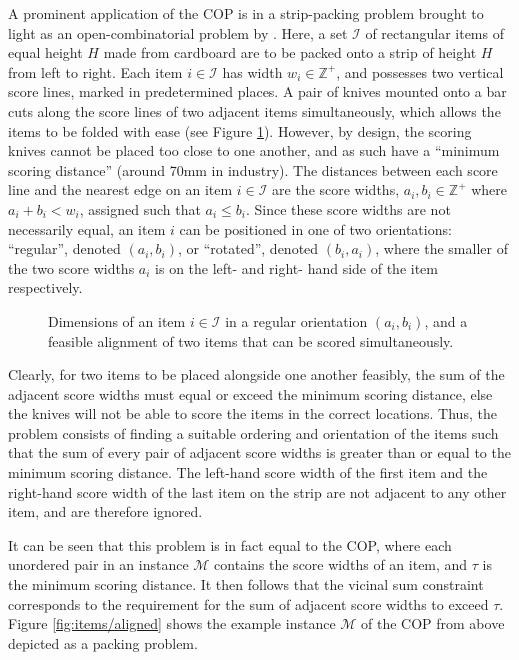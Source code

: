 \documentclass[oribibl]{llncs}
\begin{document}
A prominent application of the COP is in a strip-packing problem brought to light as an open-combinatorial problem by \cite{goulimis2004}. Here, a set $\mathcal{I}$ of rectangular items of equal height $H$ made from cardboard are to be packed onto a strip of height $H$ from left to right. Each item $i \in \mathcal{I}$ has width $w_i \in \mathbb{Z}^{+}$, and possesses two vertical score lines, marked in predetermined places. A pair of knives mounted onto a bar cuts along the score lines of two adjacent items simultaneously, which allows the items to be folded with ease (see Figure \ref{fig:itemsknife}). However, by design, the scoring knives cannot be placed too close to one another, and as such have a ``minimum scoring distance'' (around 70mm in industry). The distances between each score line and the nearest edge on an item $i \in \mathcal{I}$ are the score widths, $a_i, b_i \in \mathbb{Z}^{+}$ where $a_i + b_i < w_i$, assigned such that $a_i \leq b_i$. Since these score widths are not necessarily equal, an item $i$ can be positioned in one of two orientations: ``regular'', denoted $(a_i, b_i)$, or ``rotated'', denoted $(b_i, a_i)$, where the smaller of the two score widths $a_i$ is on the left- and right- hand side of the item respectively. 

\begin{figure}[H]	
	\centering
	
	\caption{Dimensions of an item $i \in \mathcal{I}$ in a regular orientation $(a_i, b_i)$, and a feasible alignment of two items that can be scored simultaneously.}	
	\label{fig:itemsknife}
\end{figure}

Clearly, for two items to be placed alongside one another feasibly, the sum of the adjacent score widths must equal or exceed the minimum scoring distance, else the knives will not be able to score the items in the correct locations. Thus, the problem consists of finding a suitable ordering and orientation of the items such that the sum of every pair of adjacent score widths is greater than or equal to the minimum scoring distance. The left-hand score width of the first item and the right-hand score width of the last item on the strip are not adjacent to any other item, and are therefore ignored. 

It can be seen that this problem is in fact equal to the COP, where each unordered pair in an instance $\mathcal{M}$ contains the score widths of an item, and $\tau$ is the minimum scoring distance. It then follows that the vicinal sum constraint corresponds to the requirement for the sum of adjacent score widths to exceed $\tau$. Figure \ref{fig:items/aligned} shows the example instance $\mathcal{M}$ of the COP from above depicted as a packing problem.
\end{document}

